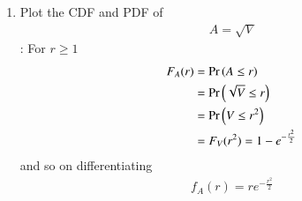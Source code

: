\documentclass[journal,12pt,twocolumn]{IEEEtran}
\renewcommand\thesection{\arabic{section}}
\begin{document}
\begin{enumerate}[label=\thesection.\arabic*
,ref=\thesection.\theenumi]
\begin{enumerate}[label=\thesection.\arabic*
,ref=\thesection.\theenumi]
\begin{align}
\implies f_{X_1,X_2}(x_1,x_2)&=\frac{e^\frac{{-x_1^2-x_2^2}}{2}}{2\pi}\\
\implies f_{X_1,X_2}(x_1,x_2)&=\frac{e^\frac{{-r^2}}{2}}{2\pi}\\
f_{R, \Theta} \brak{r, \theta} &= 
	f_{X_1,X_2}\brak{x_1,x_2} \mydet{\vec{J}}
	\end{align}
	\begin{align}
	\implies f_{R, \Theta} \brak{r, \theta} &= \frac{re^\frac{{-r^2}}{2}}{2\pi}\\
	f_R(r) &= \int_{0}^{2\pi}
		f_{R, \Theta} \brak{r, \theta} \, d\theta\\
		f_R(r) &= \int_{0}^{2\pi}
		\frac{re^\frac{{-r^2}}{2}}{2\pi} \, d\theta\\
		\implies \boxed{f_R(r)=re^{\frac{-r^2}{2}}}\\
		    F_V(r)&=F_{X_1^2+X_2^2}(r)\\
		    \implies F_V(r)&=F_{R^2}(r)
		    \end{align}
		\begin{align}
		    \implies F_V(r)&=\Pr{(R^2\le x)}\\
		    \implies F_V(r)&=\Pr{(R\le \sqrt{x})}\\
		    \text{But }F_V(x)&=\Pr{(R\le x)}\\
		    \implies F_V(x)&=\int _{0}^{x}f_R(r)dr\\
F_V(x)&=1-e^{\frac{-x^2}{2}}\\
\implies F_V(r)&=\begin{cases}
0 & r<0\\
1-e^{\frac{-r}{2}} &r\ge 0\\
\end{cases}
		\end{align}
		\begin{align}
		    \implies \boxed{\alpha=\frac{1}{2}}
		\end{align}
\item Plot the CDF and PDF of 
\begin{align}
    A=\sqrt{V}
\end{align}
\solution: For $r\ge 1$
\begin{align}
	F_A(r) &= \Pr\left(A \leq r\right) \\
	&= \Pr\left(\sqrt{V} \leq r\right) \\
	&= \Pr\left(V \leq r^2\right) \\
	&= F_V(r^2) = 1 - e^{-\frac{r^2}{2}}
\end{align}
and so on differentiating 
\begin{align}
	f_A(r) = re^{-\frac{r^2}{2}}
\end{align}

\end{enumerate}
\end{enumerate}
\end{document}
